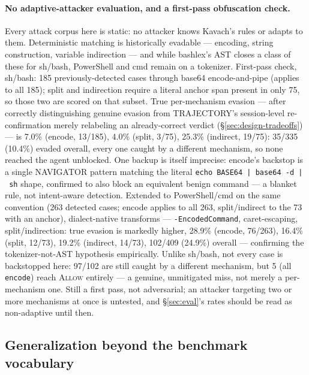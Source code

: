 \paragraph{No adaptive-attacker evaluation, and a first-pass obfuscation
check.} Every attack corpus here is static: no attacker knows Kavach's
rules or adapts to them. Deterministic matching is historically evadable
--- encoding, string construction, variable indirection --- and while
bashlex's AST closes a class of these for sh/bash, PowerShell and cmd
remain on a tokenizer. First-pass check, sh/bash: 185 previously-detected cases through base64
encode-and-pipe (applies to all 185); split and indirection require a
literal anchor span present in only 75, so those two are scored on that
subset. True per-mechanism evasion --- after correctly distinguishing
genuine evasion from TRAJECTORY's session-level re-confirmation merely
relabeling an already-correct verdict (\S\ref{sec:design-tradeoffs}) ---
is 7.0\% (encode, 13/185), 4.0\% (split, 3/75), 25.3\% (indirect, 19/75):
35/335 (10.4\%) evaded overall, every one caught by a different
mechanism, so none reached the agent unblocked. One backup is itself
imprecise: encode's backstop is a single NAVIGATOR pattern matching the
literal \texttt{echo~BASE64~|~base64~-d~\allowbreak|~sh} shape, confirmed
to also block an equivalent benign command --- a blanket rule, not
intent-aware detection. Extended to PowerShell/cmd on the same
convention (263 detected cases; encode applies to all 263, split/indirect
to the 73 with an anchor), dialect-native transforms ---
\texttt{-EncodedCommand}, caret-escaping, split/indirection: true evasion
is markedly higher, 28.9\% (encode, 76/263), 16.4\% (split, 12/73), 19.2\%
(indirect, 14/73), 102/409 (24.9\%) overall --- confirming the
tokenizer-not-AST hypothesis empirically. Unlike sh/bash, not every case
is backstopped here: 97/102 are still caught by a different mechanism,
but 5 (all \texttt{encode}) reach \textsc{Allow} entirely --- a genuine,
unmitigated miss, not merely a per-mechanism one. Still a first pass, not
adversarial; an attacker targeting two or more mechanisms at once is
untested, and \S\ref{sec:eval}'s rates should be read as non-adaptive
until then.

\subsection{Generalization beyond the benchmark vocabulary}
\label{sec:generalization-audit}

